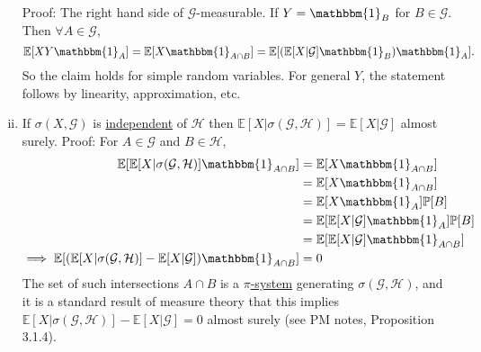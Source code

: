 \documentclass{article}
\newcommand{\G}{\mathcal{G}}
\newcommand{\1}[1]{\mathbbm{1}_{#1}}
\newcommand{\Prob}{\mathbb{P}}
\newcommand{\E}{\mathbb{E}}
\begin{document}
\begin{enumerate}[(i)]
    Proof: The right hand side of $\G$-measurable. If $Y = \1B$ for $B \in \G$. Then $\forall A \in \G$,
    \begin{equation*}
      \E[XY \1A] = \E[X \1{A\cap B}] = \E[(\E[X | \G] \1B) \1A]
    .\end{equation*}
    So the claim holds for simple random variables. For general $Y$, the statement follows by linearity, approximation, etc.
  \item If $\sigma(X, \G)$ is \hyperlink{def:indep}{independent} of $\mathcal{H}$ then $\E[X | \sigma(\G,\mathcal{H})] = \E[X | \G]$ almost surely.
    Proof: For $A \in \G$ and $B \in \mathcal{H}$,
    \begin{align*}
      \E[\E[X | \sigma(\G,\mathcal{H})] \1{A \cap B}] &= \E[X \1{A \cap B}] \\
                                                      &= \E[X \1{A\cap B}] \\
                                                      &= \E[X \1A] \Prob[B] \\
                                                      &= \E[\E[X | \G] \1A] \Prob[B] \\
                                                      &= \E[\E[X | \G] \1{A \cap B}]\\
      \implies \E[(\E[X | \sigma(\G,\mathcal{H})] - \E[X | \G]) \1{A \cap B}] &= 0
    \end{align*}
    The set of such intersections $A \cap B$ is a \hyperlink{def:pisystem}{$\pi$-system} generating $\sigma(\G, \mathcal{H})$, and it is a standard result of measure theory that this implies $\E[X | \sigma(\G, \mathcal{H})] - \E[X | \G] = 0$ almost surely (see PM notes, Proposition 3.1.4).
\end{enumerate}
\printindex
\end{document}

